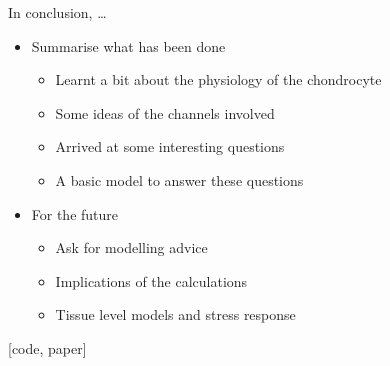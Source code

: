 \documentclass[ignorenonframetext]{beamer}
\newcommand{\references}[1] {
  \begin{flushright}
    \scriptsize [#1] \normalsize
  \end{flushright}
}
\begin{document}
\begin{frame}{In conclusion, \ldots}

  \begin{itemize}
  \item Summarise what has been done
    \begin{itemize}
      \item Learnt a bit about the physiology of the chondrocyte
      \item Some ideas of the channels involved
      \item Arrived at some interesting questions
      \item A basic model to answer these questions
    \end{itemize}
  \item For the future
    \begin{itemize}
    \item Ask for modelling advice
    \item Implications of the calculations
    \item Tissue level models and stress response
    \end{itemize}
  \end{itemize}

  \references{code, paper}

\end{frame}
\end{document}
